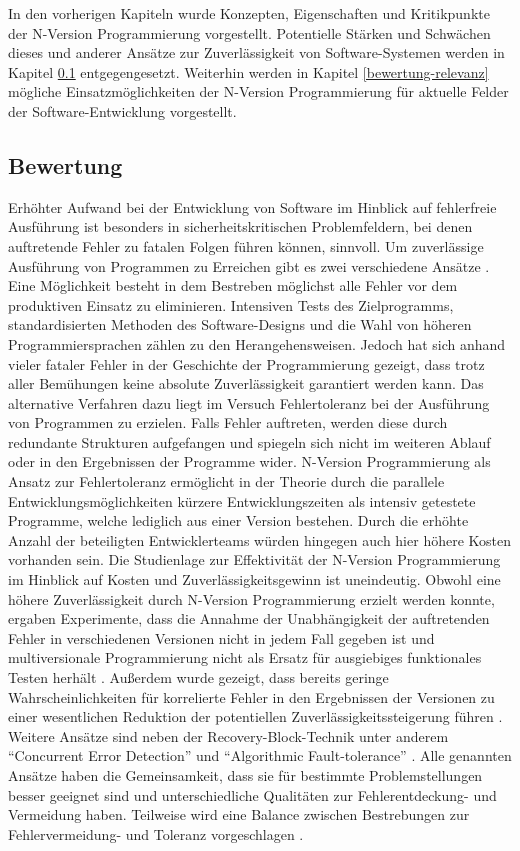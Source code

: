 %
In den vorherigen Kapiteln wurde Konzepten, Eigenschaften und Kritikpunkte der N-Version Programmierung vorgestellt.
Potentielle Stärken und Schwächen dieses und anderer Ansätze zur Zuverlässigkeit von Software-Systemen werden in Kapitel \ref{vergleich} entgegengesetzt. 
Weiterhin werden in Kapitel \ref{bewertung-relevanz} mögliche Einsatzmöglichkeiten der N-Version Programmierung für aktuelle Felder der Software-Entwicklung vorgestellt.
%
\subsection{Bewertung}\label{vergleich}
Erhöhter Aufwand bei der Entwicklung von Software im Hinblick auf fehlerfreie Ausführung ist besonders in sicherheitskritischen Problemfeldern, bei denen auftretende Fehler zu fatalen Folgen führen können, sinnvoll.
Um zuverlässige Ausführung von Programmen zu Erreichen gibt es zwei verschiedene Ansätze \cite{Avizienis:1975:FFC:800027.808469}. Eine Möglichkeit besteht in dem Bestreben möglichst alle Fehler vor dem produktiven Einsatz zu eliminieren. Intensiven Tests des Zielprogramms, standardisierten Methoden des Software-Designs und die Wahl von höheren Programmiersprachen zählen zu den Herangehensweisen. Jedoch hat sich anhand vieler fataler Fehler in der Geschichte der Programmierung gezeigt, dass trotz aller Bemühungen keine absolute Zuverlässigkeit garantiert werden kann. Das alternative Verfahren dazu liegt im Versuch Fehlertoleranz bei der Ausführung von Programmen zu erzielen. Falls Fehler auftreten, werden diese durch redundante Strukturen aufgefangen und spiegeln sich nicht im weiteren Ablauf oder in den Ergebnissen der Programme wider. N-Version Programmierung als Ansatz zur Fehlertoleranz ermöglicht in der Theorie durch die parallele Entwicklungsmöglichkeiten kürzere Entwicklungszeiten als intensiv getestete Programme, welche lediglich aus einer Version bestehen. Durch die erhöhte Anzahl der beteiligten Entwicklerteams würden hingegen auch hier höhere Kosten vorhanden sein. Die Studienlage zur Effektivität der N-Version Programmierung im Hinblick auf Kosten und Zuverlässigkeitsgewinn ist uneindeutig. Obwohl eine höhere Zuverlässigkeit durch N-Version Programmierung erzielt werden konnte, ergaben Experimente, dass die Annahme der Unabhängigkeit der auftretenden Fehler in verschiedenen Versionen nicht in jedem Fall gegeben ist \cite{Knight:1986:EEA:10677.10688} und multiversionale Programmierung nicht als Ersatz für ausgiebiges funktionales Testen herhält \cite{Shimeall:1991:ECS:104878.104899}. Außerdem wurde gezeigt, dass bereits geringe Wahrscheinlichkeiten für korrelierte Fehler in den Ergebnissen der Versionen zu einer wesentlichen Reduktion der potentiellen Zuverlässigkeitssteigerung führen \cite{Eckhardt:1985:TBA:1314034.1314066}.
Weitere Ansätze sind neben der Recovery-Block-Technik unter anderem \enquote{Concurrent Error Detection} und \enquote{Algorithmic Fault-tolerance} \cite{229487}. Alle genannten Ansätze haben die Gemeinsamkeit, dass sie für bestimmte Problemstellungen besser geeignet sind und unterschiedliche Qualitäten zur Fehlerentdeckung- und Vermeidung haben. Teilweise wird eine Balance zwischen Bestrebungen zur Fehlervermeidung- und Toleranz vorgeschlagen \cite{Avizienis:1975:FFC:800027.808469}.
%
